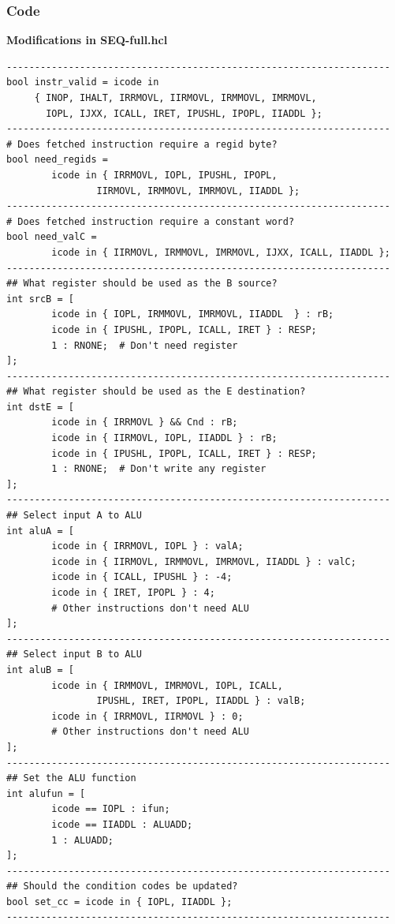 \documentclass[12pt,a4paper]{article}
\begin{document}
\subsubsection{Code}
\begin{center}
        \textbf{Modifications in SEQ-full.hcl}
\end{center}
\begin{lstlisting}
--------------------------------------------------------------------
bool instr_valid = icode in 
     { INOP, IHALT, IRRMOVL, IIRMOVL, IRMMOVL, IMRMOVL,
       IOPL, IJXX, ICALL, IRET, IPUSHL, IPOPL, IIADDL };
--------------------------------------------------------------------
# Does fetched instruction require a regid byte?
bool need_regids =
        icode in { IRRMOVL, IOPL, IPUSHL, IPOPL, 
                IIRMOVL, IRMMOVL, IMRMOVL, IIADDL };
--------------------------------------------------------------------
# Does fetched instruction require a constant word?
bool need_valC =
        icode in { IIRMOVL, IRMMOVL, IMRMOVL, IJXX, ICALL, IIADDL };
--------------------------------------------------------------------
## What register should be used as the B source?
int srcB = [
        icode in { IOPL, IRMMOVL, IMRMOVL, IIADDL  } : rB;
        icode in { IPUSHL, IPOPL, ICALL, IRET } : RESP;
        1 : RNONE;  # Don't need register
];
--------------------------------------------------------------------
## What register should be used as the E destination?
int dstE = [
        icode in { IRRMOVL } && Cnd : rB;
        icode in { IIRMOVL, IOPL, IIADDL } : rB;
        icode in { IPUSHL, IPOPL, ICALL, IRET } : RESP;
        1 : RNONE;  # Don't write any register
];
--------------------------------------------------------------------
## Select input A to ALU
int aluA = [
        icode in { IRRMOVL, IOPL } : valA;
        icode in { IIRMOVL, IRMMOVL, IMRMOVL, IIADDL } : valC;
        icode in { ICALL, IPUSHL } : -4;
        icode in { IRET, IPOPL } : 4;
        # Other instructions don't need ALU
];
--------------------------------------------------------------------
## Select input B to ALU
int aluB = [
        icode in { IRMMOVL, IMRMOVL, IOPL, ICALL, 
                IPUSHL, IRET, IPOPL, IIADDL } : valB;
        icode in { IRRMOVL, IIRMOVL } : 0;
        # Other instructions don't need ALU
];
--------------------------------------------------------------------
## Set the ALU function
int alufun = [
        icode == IOPL : ifun;
        icode == IIADDL : ALUADD;
        1 : ALUADD;
];
--------------------------------------------------------------------
## Should the condition codes be updated?
bool set_cc = icode in { IOPL, IIADDL };
--------------------------------------------------------------------
\end{lstlisting}
\end{document}

